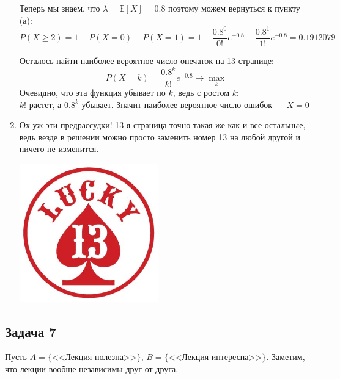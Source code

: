 \documentclass[a4paper,12pt]{article}
\theoremstyle{plain}                         %
\theoremstyle{definition}                  %
\theoremstyle{remark}                      %
\begin{document}
\begin{enumerate}
Теперь мы знаем, что $\lambda = \mathbb{E}[X] = 0.8$ поэтому можем вернуться к пункту (а):
$$
P(X \geqslant 2) = 1 - P(X=0) - P(X=1)  = 1 - \frac{0.8^0}{0!}e^{-0.8} - \frac{0.8^1}{1!}e^{-0.8} = 0.1912079
$$ \vspace{-1.2cm}

\hspace{13cm} 

Осталось найти наиболее вероятное число опечаток на 13 странице:
$$
P(X=k) = \frac{0.8^k}{k!}e^{-0.8} \rightarrow \max \limits_k
$$
Очевидно, что эта функция убывает по $k$, ведь с ростом $k$:\\
 $k!$ растет, а $0.8^k$ убывает. Значит наиболее вероятное число ошибок --- $X = 0$


\item \href{https://en.wikipedia.org/wiki/Triskaidekaphobia}{Ох уж эти предрассудки!} 13-я страница точно такая же как и все остальные, ведь везде в решении можно просто заменить номер 13 на любой другой и ничего не изменится.
\begin{center}
\includegraphics[width=6cm]{13}
\end{center}
\end{enumerate}
\newpage

\subsection*{Задача 7}
Пусть $A = \{\text{<<Лекция полезна>>}\}$, $B = \{\text{<<Лекция интересна>>}\}$. Заметим, что лекции вообще независимы друг от друга. 
\end{document}
